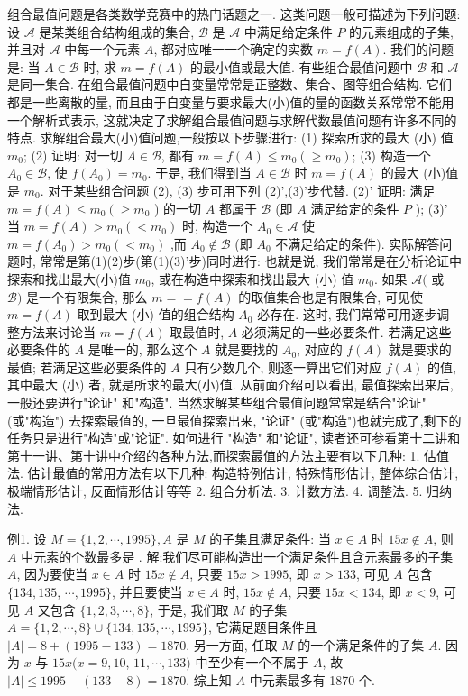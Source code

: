 
组合最值问题是各类数学竞赛中的热门话题之一.
这类问题一般可描述为下列问题:
设 $\mathscr{A}$ 是某类组合结构组成的集合, $\mathscr{B}$ 是 $\mathscr{A}$ 中满足给定条件 $P$ 的元素组成的子集, 并且对 $\mathscr{A}$ 中每一个元素 $A$, 都对应唯一一个确定的实数 $m=f(A)$. 我们的问题是: 当 $A \in \mathscr{B}$ 时, 求 $m=f(A)$ 的最小值或最大值.
有些组合最值问题中 $\mathscr{B}$ 和 $\mathscr{A}$ 是同一集合.
在组合最值问题中自变量常常是正整数、集合、图等组合结构.
它们都是一些离散的量, 而且由于自变量与要求最大(小)值的量的函数关系常常不能用一个解析式表示, 这就决定了求解组合最值问题与求解代数最值问题有许多不同的特点.
求解组合最大(小)值问题,一般按以下步骤进行:
(1) 探索所求的最大 (小) 值 $m_0$;
(2) 证明: 对一切 $A \in \mathscr{B}$, 都有 $m=f(A) \leqslant m_0\left(\geqslant m_0\right)$;
(3) 构造一个 $A_0 \in \mathscr{B}$, 使 $f\left(A_0\right)=m_0$. 于是, 我们得到当 $A \in \mathscr{B}$ 时 $m= f(A)$ 的最大 (小)值是 $m_0$.
对于某些组合问题 (2), (3) 步可用下列 (2)',(3)'步代替.
(2)' 证明: 满足 $m=f(A) \leqslant m_0\left(\geqslant m_0\right.$ ) 的一切 $A$ 都属于 $\mathscr{B}$ (即 $A$ 满足给定的条件 $P$ );
(3)' 当 $m=f(A)>m_0\left(<m_0\right)$ 时, 构造一个 $A_0 \in \mathscr{A}$ 使 $m=f\left(A_0\right)> m_0\left(<m_0\right)$ ,而 $A_0 \notin \mathscr{B}$ (即 $A_0$ 不满足给定的条件).
实际解答问题时, 常常是第(1)(2)步(第(1)(3)'步)同时进行: 也就是说, 我们常常是在分析论证中探索和找出最大(小)值 $m_0$, 或在构造中探索和找出最大 (小) 值 $m_0$.
如果 $\mathscr{A}($ 或 $\mathscr{B})$ 是一个有限集合, 那么 $m==f(A)$ 的取值集合也是有限集合, 可见使 $m=f(A)$ 取到最大 (小) 值的组合结构 $A_0$ 必存在.
这时, 我们常常可用逐步调整方法来讨论当 $m=f(A)$ 取最值时, $A$ 必须满足的一些必要条件.
若满足这些必要条件的 $A$ 是唯一的, 那么这个 $A$ 就是要找的 $A_0$, 对应的 $f(A)$ 就是要求的最值; 若满足这些必要条件的 $A$ 只有少数几个, 则逐一算出它们对应 $f(A)$ 的值, 其中最大 (小) 者, 就是所求的最大(小)值.
从前面介绍可以看出, 最值探索出来后, 一般还要进行"论证" 和"构造". 当然求解某些组合最值问题常常是结合"论证" (或"构造") 去探索最值的, 一旦最值探索出来, "论证" (或"构造")也就完成了,剩下的任务只是进行"构造"或"论证". 如何进行 "构造" 和"论证", 读者还可参看第十二讲和第十一讲、第十讲中介绍的各种方法,而探索最值的方法主要有以下几种:
1. 估值法.
估计最值的常用方法有以下几种: 构造特例估计, 特殊情形估计, 整体综合估计, 极端情形估计, 反面情形估计等等 
2. 组合分析法.
3. 计数方法.
4. 调整法.
5. 归纳法.



例1. 设 $M=\{1,2, \cdots, 1995\}, A$ 是 $M$ 的子集且满足条件: 当 $x \in A$ 时 $15 x \notin A$, 则 $A$ 中元素的个数最多是 . 
解:我们尽可能构造出一个满足条件且含元素最多的子集 $A$, 因为要使当 $x \in A$ 时 $15 x \notin A$, 只要 $15 x>1995$, 即 $x>133$, 可见 $A$ 包含 $\{134,135$, $\cdots, 1995\}$, 并且要使当 $x \in A$ 时, $15 x \notin A$, 只要 $15 x<134$, 即 $x<9$, 可见 $A$ 又包含 $\{1,2,3, \cdots, 8\}$, 于是, 我们取 $M$ 的子集 $A=\{1,2, \cdots, 8\} \cup \{134,135, \cdots, 1995\}$, 它满足题目条件且 $|A|=8+(1995-133)=1870$.
另一方面, 任取 $M$ 的一个满足条件的子集 $A$. 因为 $x$ 与 $15 x(x=9,10$, $11, \cdots, 133)$ 中至少有一个不属于 $A$, 故 $|A| \leqslant 1995-(133-8)=1870$.
综上知 $A$ 中元素最多有 1870 个.



